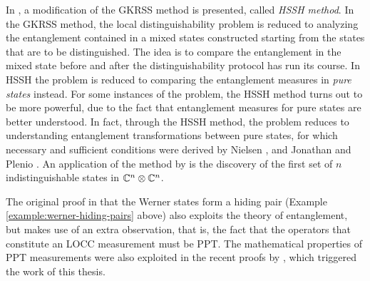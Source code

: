 In \cite{Horodecki03}, a modification of the GKRSS method is presented, 
called \emph{HSSH method}. In the GKRSS method, the local distinguishability 
problem is reduced to analyzing the entanglement contained in a mixed states
constructed starting from the states that are to be distinguished.
The idea is to compare the entanglement in the mixed state before and after 
the distinguishability protocol has run its course.
In HSSH the problem is reduced to comparing the entanglement measures in 
\emph{pure states} instead. For some instances of the problem, the HSSH method
turns out to be more powerful, due to the fact that entanglement measures for 
pure states are better understood. In fact, through the HSSH method, the problem reduces 
to understanding entanglement transformations between pure states,   
for which necessary and sufficient conditions were derived by Nielsen \cite{Nielsen99}, and
Jonathan and Plenio \cite{Jonathan99}.
An application of the method by \cite{Horodecki03} is the discovery of the first 
set of $n$ indistinguishable states in $\mathbb{C}^{n}\otimes\mathbb{C}^{n}$.

The original proof in \cite{Terhal01a} that the Werner states form a hiding pair 
(Example \ref{example:werner-hiding-pairs} above) also exploits the theory of entanglement,
but makes use of an extra observation, that is, the fact that the operators 
that constitute an LOCC measurement must be PPT.
The mathematical properties of PPT measurements were also exploited in the recent 
proofs by \cite{Yu12,Yu14}, which triggered the work of this thesis.
